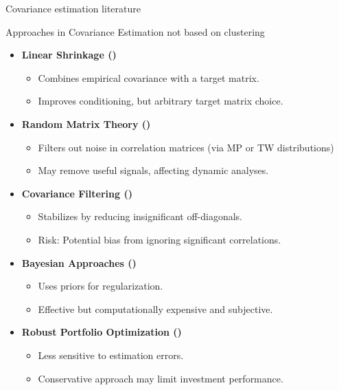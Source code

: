 \documentclass[dvipsnames,mathserif]{beamer}
\begin{document}
\begin{frame}{Covariance estimation literature}

Approaches in Covariance Estimation not based on clustering

\begin{itemize}
 \item \textbf{Linear Shrinkage (\cite{LedoitWolfShrinkage})}
            \begin{itemize}
                \item Combines empirical covariance with a target matrix.
                \item Improves conditioning, but arbitrary target matrix choice.
            \end{itemize}

        \item \textbf{Random Matrix Theory (\cite{laloux})}
            \begin{itemize}
                \item Filters out noise in correlation matrices (via MP or TW distributions)
                \item May remove useful signals, affecting dynamic analyses.
            \end{itemize}

        \item \textbf{Covariance Filtering (\cite{BickelLevina2008})}
            \begin{itemize}
                \item Stabilizes by reducing insignificant off-diagonals.
                \item Risk: Potential bias from ignoring significant correlations.
            \end{itemize}

        \item \textbf{Bayesian Approaches (\cite{Ledoit2003})}
            \begin{itemize}
                \item Uses priors for regularization.
                \item Effective but computationally expensive and subjective.
            \end{itemize}

        \item \textbf{Robust Portfolio Optimization (\cite{GoldfarbIyengar2003})}
            \begin{itemize}
                \item Less sensitive to estimation errors.
                \item Conservative approach may limit investment performance.
            \end{itemize}
    \end{itemize}

\end{frame}
\end{document}
